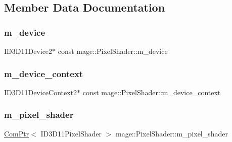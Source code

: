 \subsection{Member Data Documentation}
\hypertarget{classmage_1_1_pixel_shader_a7fa34f27d8f39db2403edac28ddecc68}{}\label{classmage_1_1_pixel_shader_a7fa34f27d8f39db2403edac28ddecc68} 
\subsubsection{\texorpdfstring{m\+\_\+device}{m\_device}}
{\footnotesize\ttfamily I\+D3\+D11\+Device2$\ast$ const mage\+::\+Pixel\+Shader\+::m\+\_\+device\hspace{0.3cm}{\ttfamily [protected]}}

\hypertarget{classmage_1_1_pixel_shader_a6b9bbf18f255b061fb75453f32a78720}{}\label{classmage_1_1_pixel_shader_a6b9bbf18f255b061fb75453f32a78720} 
\subsubsection{\texorpdfstring{m\+\_\+device\+\_\+context}{m\_device\_context}}
{\footnotesize\ttfamily I\+D3\+D11\+Device\+Context2$\ast$ const mage\+::\+Pixel\+Shader\+::m\+\_\+device\+\_\+context\hspace{0.3cm}{\ttfamily [protected]}}

\hypertarget{classmage_1_1_pixel_shader_a1dd0f87be1c1f7fe5a1bb2737263222f}{}\label{classmage_1_1_pixel_shader_a1dd0f87be1c1f7fe5a1bb2737263222f} 
\subsubsection{\texorpdfstring{m\+\_\+pixel\+\_\+shader}{m\_pixel\_shader}}
{\footnotesize\ttfamily \hyperlink{namespacemage_ae74f374780900893caa5555d1031fd79}{Com\+Ptr}$<$ I\+D3\+D11\+Pixel\+Shader $>$ mage\+::\+Pixel\+Shader\+::m\+\_\+pixel\+\_\+shader\hspace{0.3cm}{\ttfamily [protected]}}

